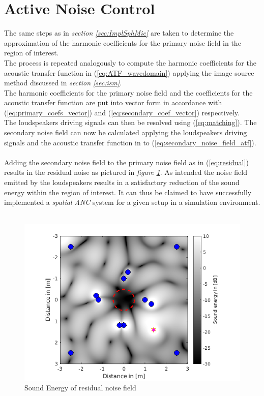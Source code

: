 \section{Active Noise Control}
The same steps as in \textit{section \ref{sec:ImplSphMic}} are taken to determine the approximation of the harmonic coefficients for the primary noise field in the region of interest.\\
The process is repeated analogously to compute the harmonic coefficients for the acoustic transfer function in (\ref{eq:ATF_wavedomain}) applying the image source method discussed in \textit{section \ref{sec:ism}}.\\
The harmonic coefficients for the primary noise field and the coefficients for the acoustic transfer function are put into vector form in accordance with (\ref{eq:primary_coefs_vector}) and (\ref{eq:secondary_coef_vector}) respectively.\\
The loudspeakers driving signals can then be resolved using (\ref{eq:matching}).
The secondary noise field can now be calculated applying the loudspeakers driving signals and the acoustic transfer function in to (\ref{eq:secondary_noise_field_atf}).\\\\
Adding the secondary noise field to the primary noise field as in (\ref{eq:residual}) results in the residual noise as pictured in \textit{figure \ref{fig:ANC1}}. As intended the noise field emitted by the loudspeakers results in a satisfactory reduction of the sound energy within the region of interest. It can thus be claimed to have successfully implemented a \textit{spatial ANC} system for a given setup in a simulation environment.\\\\

\begin{figure}[H]
    \centerline{\includegraphics[width=\textwidth]{LaTeX/images/plots/ANC_1.png}}
    \caption{Sound Energy of residual noise field}
    \label{fig:ANC1}
\end{figure}

